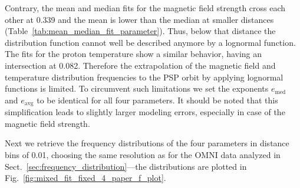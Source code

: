 Contrary, the mean and median fits for the magnetic field strength cross each other at \SI{0.339}{\au} and the mean is lower than the median at smaller distances (Table~\ref{tab:mean_median_fit_parameter}). Thus, below that distance the distribution function cannot well be described anymore by a lognormal function. The fits for the proton temperature show a similar behavior,
having an intersection at \SI{0.082}{\au}. Therefore the extrapolation of the magnetic field and temperature distribution frequencies to the PSP orbit by applying lognormal functions is limited. To circumvent such limitations we set the exponents $e_\text{med}$ and $e_\text{avg}$ to be identical for all four parameters. It should be noted that this simplification leads to slightly larger modeling errors, especially in case of the magnetic field strength.

Next we retrieve the frequency distributions of the four parameters in distance bins of \SI{0.01}{\au},  choosing the same resolution as for the OMNI data analyzed in Sect.~\ref{sec:frequency_distribution}---the distributions are plotted in Fig.~\ref{fig:mixed_fit_fixed_4_paper_f_plot}.


